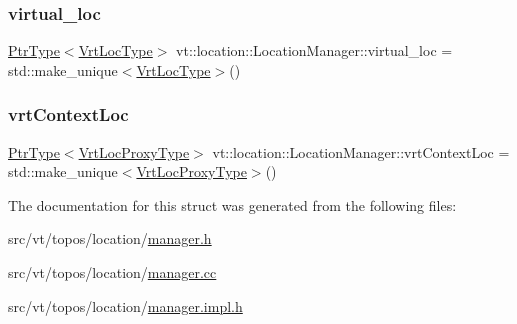 \mbox{\label{structvt_1_1location_1_1_location_manager_af8cbcba6c30a17a56d69fcf48007cdad}} 
\subsubsection{\texorpdfstring{virtual\+\_\+loc}{virtual\_loc}}
{\footnotesize\ttfamily \hyperlink{structvt_1_1location_1_1_location_manager_a32d8bca6ed6909a2190286408335d3b4}{Ptr\+Type}$<$\hyperlink{structvt_1_1location_1_1_location_manager_a06ec1698d93780afdf7873eeaa3a77b6}{Vrt\+Loc\+Type}$>$ vt\+::location\+::\+Location\+Manager\+::virtual\+\_\+loc = std\+::make\+\_\+unique$<$\hyperlink{structvt_1_1location_1_1_location_manager_a06ec1698d93780afdf7873eeaa3a77b6}{Vrt\+Loc\+Type}$>$()}

\mbox{\label{structvt_1_1location_1_1_location_manager_aec12685db3f4c7c9fec6348496689174}} 
\subsubsection{\texorpdfstring{vrt\+Context\+Loc}{vrtContextLoc}}
{\footnotesize\ttfamily \hyperlink{structvt_1_1location_1_1_location_manager_a32d8bca6ed6909a2190286408335d3b4}{Ptr\+Type}$<$\hyperlink{structvt_1_1location_1_1_location_manager_a3e410c85f5790a526a4eda22a9cc7881}{Vrt\+Loc\+Proxy\+Type}$>$ vt\+::location\+::\+Location\+Manager\+::vrt\+Context\+Loc = std\+::make\+\_\+unique$<$\hyperlink{structvt_1_1location_1_1_location_manager_a3e410c85f5790a526a4eda22a9cc7881}{Vrt\+Loc\+Proxy\+Type}$>$()}



The documentation for this struct was generated from the following files\+:\begin{DoxyCompactItemize}
\item 
src/vt/topos/location/\hyperlink{topos_2location_2manager_8h}{manager.\+h}\item 
src/vt/topos/location/\hyperlink{topos_2location_2manager_8cc}{manager.\+cc}\item 
src/vt/topos/location/\hyperlink{topos_2location_2manager_8impl_8h}{manager.\+impl.\+h}\end{DoxyCompactItemize}
